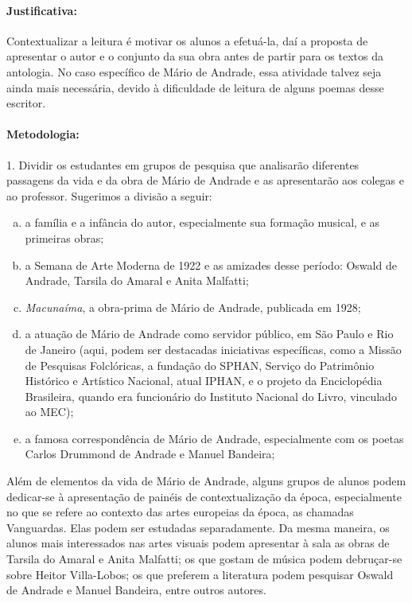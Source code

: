 \documentclass[11pt]{extarticle}
\begin{document}
\paragraph{Justificativa:} Contextualizar a leitura é motivar os alunos a
efetuá-la, daí a proposta de apresentar o autor e o conjunto da sua obra
antes de partir para os textos da antologia. No caso específico de Mário
de Andrade, essa atividade talvez seja ainda mais necessária, devido à
dificuldade de leitura de alguns poemas desse escritor.

\paragraph{Metodologia:}


1. Dividir os estudantes em grupos de pesquisa que analisarão diferentes
passagens da vida e da obra de Mário de Andrade e as apresentarão aos
colegas e ao professor. Sugerimos a divisão a seguir:

\begin{enumerate}[(a)]
\item a família e a infância do autor, especialmente sua formação musical,
e as primeiras obras;

\item a Semana de Arte Moderna de 1922 e as amizades desse período: Oswald
de Andrade, Tarsila do Amaral e Anita Malfatti;

\item \emph{Macunaíma}, a obra-prima de Mário de Andrade, publicada em
1928;

\item a atuação de Mário de Andrade como servidor público, em São Paulo e
Rio de Janeiro (aqui, podem ser destacadas iniciativas específicas, como
a Missão de Pesquisas Folclóricas, a fundação do SPHAN, Serviço do
Patrimônio Histórico e Artístico Nacional, atual IPHAN, e o projeto da
Enciclopédia Brasileira, quando era funcionário do Instituto Nacional do
Livro, vinculado ao MEC);

\item a famosa correspondência de Mário de Andrade, especialmente com os
poetas Carlos Drummond de Andrade e Manuel Bandeira;
\end{enumerate}

Além de elementos da vida de Mário de Andrade, alguns grupos de alunos
podem dedicar-se à apresentação de painéis de contextualização da época,
especialmente no que se refere ao contexto das artes europeias da época,
as chamadas Vanguardas. Elas podem ser estudadas separadamente. Da mesma
maneira, os alunos mais interessados nas artes visuais podem apresentar
à sala as obras de Tarsila do Amaral e Anita Malfatti; os que gostam de
música podem debruçar-se sobre Heitor Villa-Lobos; os que preferem a
literatura podem pesquisar Oswald de Andrade e Manuel Bandeira, entre
outros autores.
\end{document}
